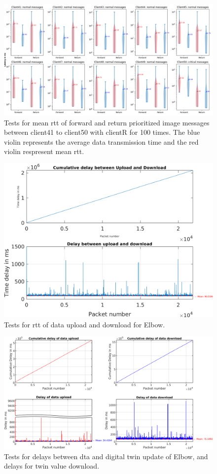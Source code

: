 \begin{figure}
    \includegraphics[width=\textheight]{figures/appendix/priority_tests/log_violin_50clients_image_figure_5.png}\hfill 
    \caption{Tests for mean \gls{rtt} of forward and return prioritized image messages between client41 to client50 
    with clientR for 100 times. The blue violin represents the average data transmission time and the red violin 
    respresent mean \gls{rtt}.} \label{fig: priority-50clients-image-e}
\end{figure}


\begin{figure}[htb]
    \includegraphics[width=\textwidth]{figures/appendix/DT/Delay_UploadDownloadCycleTime_Elbow.png}\hfill 
    \caption{Tests for \gls{rtt} of data upload and download for Elbow.} \label{fig: UD-cycle-Elbow}
\end{figure}

\begin{figure}[htb]
    \includegraphics[width=\textwidth]{figures/appendix/DT/Delay_UploadDownload_Elbow.png}
    \centering
    \caption{Tests for delays between \gls{dta} and digital twin update of Elbow, 
    and delays for twin value download. \label{fig: UD-sep-Elbow}}
\end{figure}